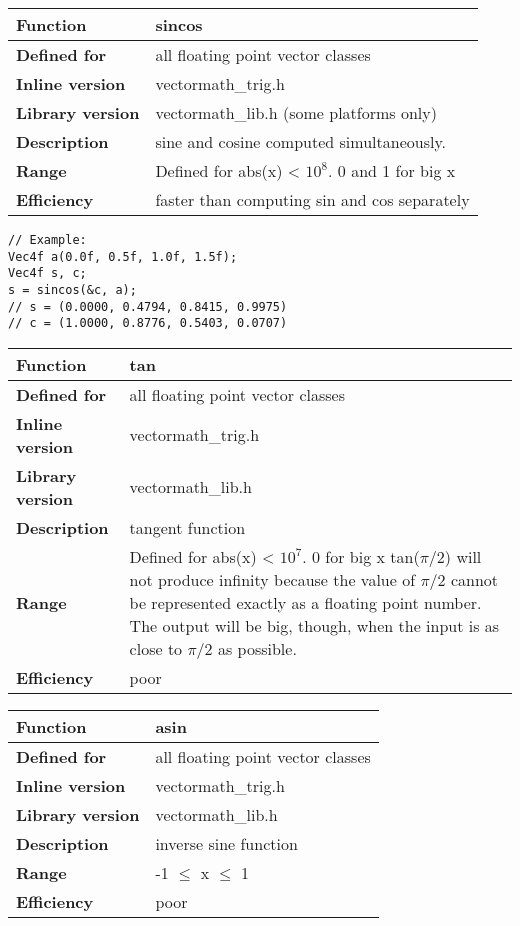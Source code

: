\documentclass[vcl_manual.tex]{subfiles}
\begin{document}
\begin{tabular}{|p{30mm}|p{120mm}|}
\hline
\bfseries Function & sincos \\ \hline
\bfseries Defined for & all floating point vector classes \\ \hline
\bfseries Inline version & vectormath\_trig.h \\ \hline
\bfseries Library version & vectormath\_lib.h (some platforms only) \\ \hline
\bfseries Description & sine and cosine computed simultaneously.\\ \hline
\bfseries Range & Defined for abs(x) \textless{} $10^8$. 0 and 1 for big x \\ \hline
\bfseries Efficiency & faster than computing sin and cos separately \\ \hline
\end{tabular}
\begin{lstlisting}[frame=none]
// Example:
Vec4f a(0.0f, 0.5f, 1.0f, 1.5f);
Vec4f s, c;
s = sincos(&c, a);
// s = (0.0000, 0.4794, 0.8415, 0.9975)
// c = (1.0000, 0.8776, 0.5403, 0.0707)
\end{lstlisting}


\begin{tabular}{|p{30mm}|p{120mm}|}
\hline
\bfseries Function & tan \\ \hline
\bfseries Defined for & all floating point vector classes \\ \hline
\bfseries Inline version & vectormath\_trig.h \\ \hline
\bfseries Library version & vectormath\_lib.h \\ \hline
\bfseries Description & tangent function \\ \hline
\bfseries Range & Defined for abs(x) \textless{} $10^7$. 0 for big x \newline
tan($\pi/2$) will not produce infinity because the value of $\pi/2$ cannot be represented exactly as a floating point number. The output will be big, though, when the input is as close to $\pi/2$ as possible.\\ \hline
\bfseries Efficiency & poor \\ \hline
\end{tabular}


\begin{tabular}{|p{30mm}|p{120mm}|}
\hline
\bfseries Function & asin \\ \hline
\bfseries Defined for & all floating point vector classes \\ \hline
\bfseries Inline version & vectormath\_trig.h \\ \hline
\bfseries Library version & vectormath\_lib.h \\ \hline
\bfseries Description & inverse sine function \\ \hline
\bfseries Range & -1 $\leq$ x $\leq$ 1 \\ \hline
\bfseries Efficiency & poor \\ \hline
\end{tabular}
\end{document}
